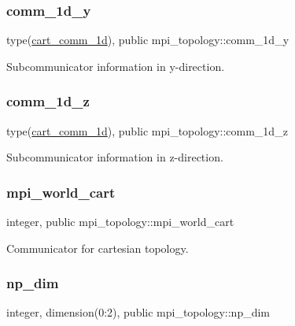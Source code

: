 \subsubsection{\texorpdfstring{comm\+\_\+1d\+\_\+y}{comm\_1d\_y}}
{\footnotesize\ttfamily type(\hyperlink{structmpi__topology_1_1cart__comm__1d}{cart\+\_\+comm\+\_\+1d}), public mpi\+\_\+topology\+::comm\+\_\+1d\+\_\+y}



Subcommunicator information in y-\/direction. 

\mbox{\label{namespacempi__topology_aed5c66dd4697b116c53db4613ad802ce}} 
\subsubsection{\texorpdfstring{comm\+\_\+1d\+\_\+z}{comm\_1d\_z}}
{\footnotesize\ttfamily type(\hyperlink{structmpi__topology_1_1cart__comm__1d}{cart\+\_\+comm\+\_\+1d}), public mpi\+\_\+topology\+::comm\+\_\+1d\+\_\+z}



Subcommunicator information in z-\/direction. 

\mbox{\label{namespacempi__topology_a2b10bc780ba4b14ea773c36f3e489a94}} 
\subsubsection{\texorpdfstring{mpi\+\_\+world\+\_\+cart}{mpi\_world\_cart}}
{\footnotesize\ttfamily integer, public mpi\+\_\+topology\+::mpi\+\_\+world\+\_\+cart}



Communicator for cartesian topology. 

\mbox{\label{namespacempi__topology_ac837e97cb4896a72d94eb7a9f12d6682}} 
\subsubsection{\texorpdfstring{np\+\_\+dim}{np\_dim}}
{\footnotesize\ttfamily integer, dimension(0\+:2), public mpi\+\_\+topology\+::np\+\_\+dim}



